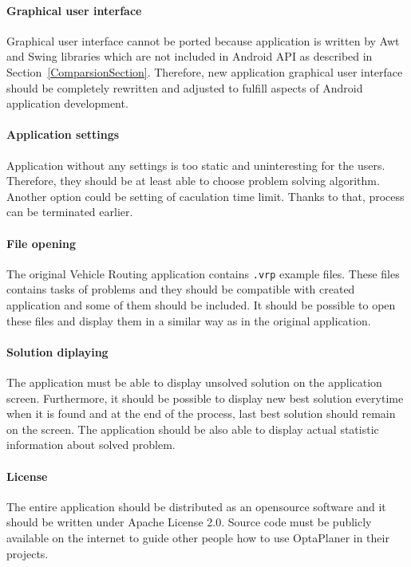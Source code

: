 \paragraph{Graphical user interface}
Graphical user interface cannot be ported because application is written by Awt and Swing libraries which are not
included in Android API as described in Section~\ref{ComparsionSection}. Therefore, new application graphical user
interface should be completely rewritten and adjusted to fulfill aspects of Android application development.

\paragraph{Application settings}
Application without any settings is too static and uninteresting for the users. Therefore, they should be at least able
to choose problem solving algorithm. Another option could be setting of caculation time limit. Thanks to that, process
can be terminated earlier.

\paragraph{File opening}
The original Vehicle Routing application contains \texttt{.vrp} example files. These files contains tasks of problems
and they should be compatible with created application and some of them should be included. It should be possible to
open these files and display them in a similar way as in the original application.

\paragraph{Solution diplaying}
The application must be able to display unsolved solution on the application screen. Furthermore, it should be possible
to display new best solution everytime when it is found and at the end of the process, last best solution should remain
on the screen. The application should be also able to display actual statistic information about solved problem.

\paragraph{License}
The entire application should be distributed as an opensource software and it should be written under Apache License
2.0. Source code must be publicly available on the internet to guide other people how to use OptaPlaner in their
projects.

